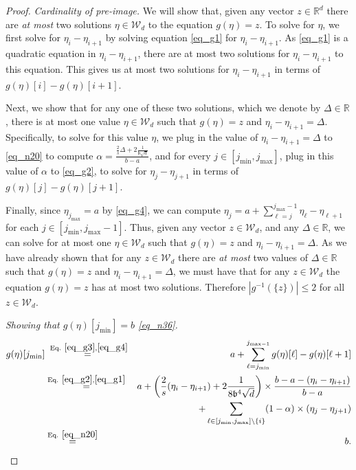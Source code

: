 \documentclass[11pt,letterpaper]{article}
\begin{document}
\begin{proof}
\noindent
%
{\em Cardinality of pre-image.}
%
 We will show that, given any vector $z \in \mathbb{R}^d$ there are {\em at most} two solutions $\eta \in \mathcal{W}_d$ to the equation $g(\eta) = z$.
%
To solve for $\eta$, we first solve for $\eta_{i}- \eta_{i+1}$ by solving equation \eqref{eq_g1} for $\eta_{i}- \eta_{i+1}$.
%
 As \eqref{eq_g1} is a quadratic equation in $\eta_{i}- \eta_{i+1}$, there are at most two solutions for $\eta_{i}- \eta_{i+1}$ to this equation.
%
%
This gives us at most two solutions for $\eta_{i}- \eta_{i+1}$ in terms of $g(\eta)[i] - g(\eta)[i+1]$.
%

Next, we show that for any one of these two solutions, which we denote by $\Delta \in \mathbb{R}$, there is at most one value $\eta \in \mathcal{W}_d$ such that $g(\eta) = z$ and $\eta_{i}- \eta_{i+1} = \Delta$.
%
 Specifically, to solve for this value $\eta$, we plug in the value of $\eta_{i}- \eta_{i+1} = \Delta$ to \eqref{eq_n20} to compute $ \alpha = \frac{ \frac{2}{s}\Delta +2\frac{1}{\mathfrak{b}\sqrt{d}} }{b-a}$, and  for every $j \in[j_{\mathrm{min}}, j_{\mathrm{max}}]$, plug in this value of $\alpha$ to \eqref{eq_g2}, to solve for $\eta_j-\eta_{j+1}$ in terms of $g(\eta)[j] - g(\eta)[j+1]$.
%


Finally, since $\eta_{j_{\mathrm{max}}} = a$ by \eqref{eq_g4}, we can compute  $\eta_j = a+ \sum_{\ell=j}^{j_{\mathrm{max}} -1} \eta_\ell - \eta_{\ell+1}$ for each $j \in[j_{\mathrm{min}}, j_{\mathrm{max}}-1]$.
%
Thus, given any vector $z \in \mathcal{W}_d$, and any $\Delta \in \mathbb{R}$, we can solve for at most one $\eta \in \mathcal{W}_d$ such that $g(\eta) = z$ and $\eta_{i}- \eta_{i+1} = \Delta$.
%
As we have already shown that for any $z \in \mathcal{W}_d$ there are {\em at most} two values of $\Delta \in \mathbb{R}$ such that $g(\eta) = z$ and $\eta_{i}- \eta_{i+1} = \Delta$, we must have that for any $z \in \mathcal{W}_d$ the equation  $g(\eta) = z$ has at most two solutions.  Therefore  $|g^{-1}(\{z\})| \leq 2$ for all $z \in \mathcal{W}_d$.


\medskip
\noindent
{\em Showing that $g(\eta)[j_{\mathrm{min}}] = b$ \eqref{eq_n36}.}
%
\begin{eqnarray*}
    g(\eta)[j_{\mathrm{min}}] &\stackrel{\textrm{ Eq. } \eqref{eq_g3}, \eqref{eq_g4}}{=}& a+ \sum_{\ell=j_{\mathrm{min}}}^{j_{\mathrm{max} -1}}  g(\eta)[\ell] -  g(\eta)[\ell+1]\\
&\stackrel{\textrm{Eq. } \eqref{eq_g2},  \eqref{eq_g1}}{=}& a+  \left(\frac{2}{s}(\eta_{i}- \eta_{i+1})+ 2\frac{1}{8\mathfrak{b}^4\sqrt{d}}\right) \times \frac{b-a -(\eta_i- \eta_{i+1})}{b-a} \nonumber\\  
%
& & + \sum_{\ell\in [j_{\mathrm{min}}, j_{\mathrm{max}} ] \backslash \{i\}}    (1-\alpha) \times (\eta_j - \eta_{j+1})\\
%
&\stackrel{\textrm{Eq. } \eqref{eq_n20}}{=}& b.
\end{eqnarray*}


\end{proof}
\end{document}
